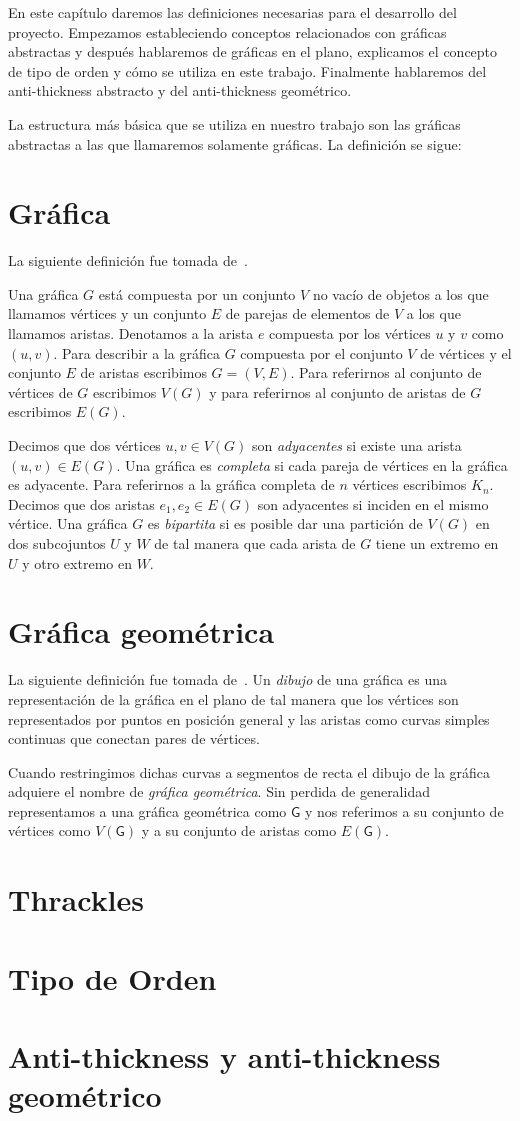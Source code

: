 En este capítulo daremos las definiciones necesarias para el desarrollo del proyecto.
Empezamos estableciendo conceptos relacionados con gráficas abstractas y después
hablaremos de gráficas en el plano, explicamos el concepto de tipo de orden y cómo
se utiliza en este trabajo. Finalmente hablaremos del anti-thickness abstracto
y del anti-thickness geométrico.

La estructura más básica que se utiliza en nuestro trabajo son las gráficas abstractas
a las que llamaremos solamente gráficas. La definición se sigue:
\section{Gráfica}
La siguiente definición fue tomada de~\cite{Chartrand2008}.

Una gráfica $G$ está compuesta por un conjunto $V$ no vacío de objetos a los que llamamos vértices
y un conjunto $E$ de parejas de elementos de $V$ a los que llamamos aristas. Denotamos
a la arista $e$ compuesta por los vértices $u$ y $v$ como $(u,v)$. Para describir a la gráfica $G$
compuesta por el conjunto $V$ de vértices y el conjunto $E$ de aristas escribimos $G=(V,E)$.
Para referirnos al conjunto de vértices de $G$ escribimos $V(G)$ y para referirnos
al conjunto de aristas de $G$ escribimos $E(G)$.

Decimos que dos vértices $u,v\in V(G)$ son \emph{adyacentes} si existe una arista
$(u,v)\in E(G)$. Una gráfica es \emph{completa} si cada pareja de vértices
en la gráfica es adyacente. Para referirnos a la gráfica completa de $n$ vértices
escribimos $K_n$. Decimos que dos aristas $e_1,e_2 \in E(G)$ son adyacentes
si inciden en el mismo vértice. Una gráfica $G$ es \emph{bipartita} si es posible
dar una partición de $V(G)$ en dos subcojuntos $U$ y $W$ de tal manera que cada
arista de $G$ tiene un extremo en $U$ y otro extremo en $W$. 
\section{Gráfica geométrica}
La siguiente definición fue tomada de~\cite{Pach2013}.
Un \emph{dibujo} de una gráfica es una representación de la gráfica en el plano de
tal manera que los vértices son representados por puntos en posición general
y las aristas como curvas simples continuas que conectan pares de vértices.

Cuando restringimos dichas curvas a segmentos de recta el dibujo de la gráfica
adquiere el nombre de \emph{gráfica geométrica}. Sin perdida de generalidad
representamos a una gráfica geométrica como $\mathsf{G}$ y nos referimos a su
conjunto de vértices como $V(\mathsf{G})$ y a su conjunto de aristas como
$E(\mathsf{G})$.

\section{Thrackles}
\section{Tipo de Orden}
\section{Anti-thickness y anti-thickness geométrico}
